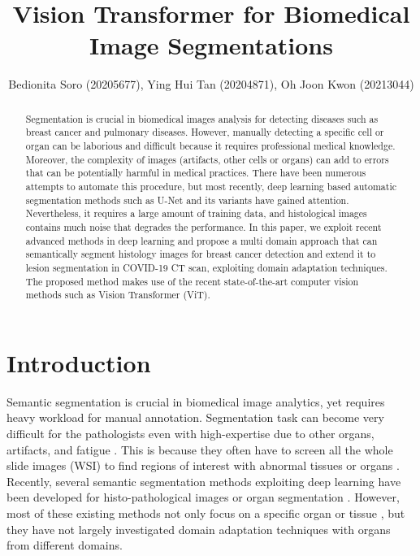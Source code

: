 \documentclass[final]{cvpr}
\begin{document}
\title{Vision Transformer for Biomedical Image Segmentations}
\author{Bedionita Soro (20205677), Ying Hui Tan (20204871), Oh Joon Kwon (20213044)}

\maketitle

\begin{abstract}
Segmentation is crucial in biomedical images analysis for detecting diseases such as breast cancer and pulmonary diseases. However, manually detecting a specific cell or organ can be laborious and difficult because it requires professional medical knowledge. Moreover, the complexity of images (artifacts, other cells or organs) can add to errors that can be potentially harmful in medical practices. There have been numerous attempts to automate this procedure, but most recently, deep learning based automatic segmentation methods such as U-Net and its variants have gained attention. 
Nevertheless, it requires a large amount of training data, and histological images contains much noise that degrades the performance. In this paper, we exploit  recent advanced methods in deep learning and propose a multi domain approach that can semantically segment histology images for breast cancer detection and extend it to lesion segmentation in COVID-19 CT scan, exploiting domain adaptation techniques. The proposed method makes use of the recent state-of-the-art computer vision methods such as Vision Transformer (ViT). 
\end{abstract}


\section{Introduction}
Semantic segmentation is crucial in biomedical image analytics, yet requires heavy workload for manual annotation. Segmentation task can become very difficult for the pathologists even with high-expertise due to other organs, artifacts, and fatigue \cite{KRUPINSKI20061543}. This is because they often have to screen all the whole slide images (WSI) to find regions of interest with abnormal tissues or organs \cite{Randell01}. Recently, several semantic segmentation methods exploiting deep learning have been developed for histo-pathological images or organ segmentation \cite{lei2020medical}. However, most of these existing methods not only focus on a specific organ or tissue \cite{chan2019histosegnet}, but they have not largely investigated domain adaptation techniques with organs from different domains.
\end{document}
